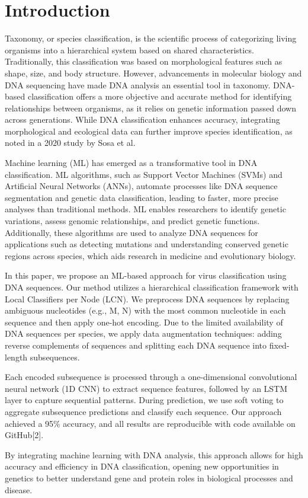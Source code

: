 \section{Introduction}
Taxonomy, or species classification, is the scientific process of categorizing living organisms into a hierarchical system based on shared characteristics. Traditionally, this classification was based on morphological features such as shape, size, and body structure. However, advancements in molecular biology and DNA sequencing have made DNA analysis an essential tool in taxonomy. DNA-based classification offers a more objective and accurate method for identifying relationships between organisms, as it relies on genetic information passed down across generations. While DNA classification enhances accuracy, integrating morphological and ecological data can further improve species identification, as noted in a 2020 study by Sosa et al.

Machine learning (ML) has emerged as a transformative tool in DNA classification. ML algorithms, such as Support Vector Machines (SVMs) and Artificial Neural Networks (ANNs), automate processes like DNA sequence segmentation and genetic data classification, leading to faster, more precise analyses than traditional methods. ML enables researchers to identify genetic variations, assess genomic relationships, and predict genetic functions. Additionally, these algorithms are used to analyze DNA sequences for applications such as detecting mutations and understanding conserved genetic regions across species, which aids research in medicine and evolutionary biology.

In this paper, we propose an ML-based approach for virus classification using DNA sequences. Our method utilizes a hierarchical classification framework with Local Classifiers per Node (LCN). We preprocess DNA sequences by replacing ambiguous nucleotides (e.g., M, N) with the most common nucleotide in each sequence and then apply one-hot encoding. Due to the limited availability of DNA sequences per species, we apply data augmentation techniques: adding reverse complements of sequences and splitting each DNA sequence into fixed-length subsequences.

Each encoded subsequence is processed through a one-dimensional convolutional neural network (1D CNN) to extract sequence features, followed by an LSTM layer to capture sequential patterns. During prediction, we use soft voting to aggregate subsequence predictions and classify each sequence. Our approach achieved a 95\% accuracy, and all results are reproducible with code available on GitHub[2].

By integrating machine learning with DNA analysis, this approach allows for high accuracy and efficiency in DNA classification, opening new opportunities in genetics to better understand gene and protein roles in biological processes and disease.
